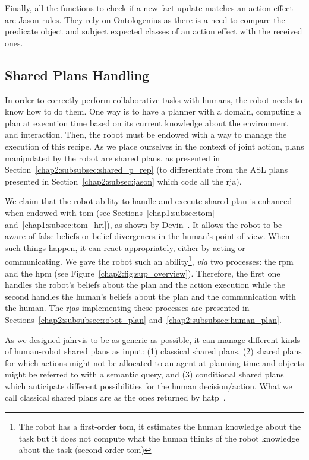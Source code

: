 \documentclass[a4paper,11pt,twoside]{StyleThese}
\begin{document}
Finally, all the functions to check if a new fact update matches an action effect are Jason rules. They rely on Ontologenius as there is a need to compare the predicate object and subject expected classes of an action effect with the received ones.

\subsection{Shared Plans Handling}\label{chap2:subsec:plan_handling}
In order to correctly perform collaborative tasks with humans, the robot needs to know how to do them. One way is to have a planner with a domain, computing a plan at execution time based on its current knowledge about the environment and interaction. Then, the robot must be endowed with a way to manage the execution of this recipe. As we place ourselves in the context of joint action, plans manipulated by the robot are shared plans, as presented in Section~\ref{chap2:subsubsec:shared_p_rep} (to differentiate from the ASL plans presented in Section~\ref{chap2:subsec:jason} which code all the \acrshort{rja}).

We claim that the robot ability to handle and execute shared plan is enhanced when endowed with \acrfull{tom} (see Sections~\ref{chap1:subsec:tom} and~\ref{chap1:subsec:tom_hri}), as shown by Devin~\cite{devin_2016_implemented}. It allows the robot to be aware of false beliefs or belief divergences in the human's point of view. When such things happen, it can react appropriately, either by acting or communicating. We gave the robot such an ability\footnote{The robot has a first-order \acrshort{tom}, it estimates the human knowledge about the task but it does not compute what the human thinks of the robot knowledge about the task (second-order \acrshort{tom})}, \textit{via} two processes: the \acrfull{rpm} and the \acrfull{hpm} (see Figure~\ref{chap2:fig:sup_overview}). Therefore, the first one handles the robot's beliefs about the plan and the action execution while the second handles the human's beliefs about the plan and the communication with the human. The \acrshort{rja}s implementing these processes are presented in Sections~\ref{chap2:subsubsec:robot_plan} and~\ref{chap2:subsubsec:human_plan}.

As we designed \acrshort{jahrvis} to be as generic as possible, it can manage different kinds of human-robot shared plans as input: (1) classical shared plans, (2) shared plans for which actions might not be allocated to an agent at planning time and objects might be referred to with a semantic query, and (3) conditional shared plans which anticipate different possibilities for the human decision/action. What we call classical shared plans are as the ones returned by \acrfull{hatp}~\cite{lallement_2014_hatp}. 
\end{document}
